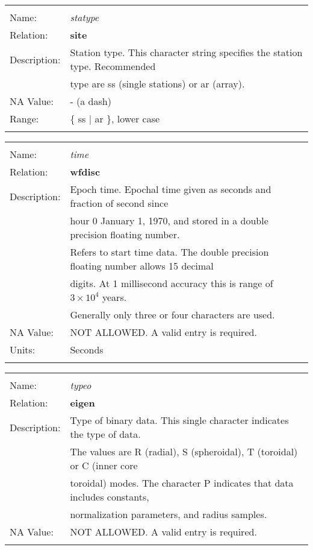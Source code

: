 \begin{tabular*}{6.5 in}{ll} \hline
\\
Name: & {\it statype} \\
Relation: & {\bf site} \\
Description: & Station type. This character string specifies the station type. Recommended \\
& type are ss (single stations) or ar (array). \\
NA Value: & - (a dash) \\
Range: & \{ ss $|$ ar \}, lower case \\
&\\
\end{tabular*}
\begin{tabular*}{6.5 in}{ll} \hline
\\
Name: & {\it time} \\
Relation: & {\bf wfdisc} \\
Description: & Epoch time. Epochal time given as seconds and fraction of second since \\
& hour $0$ January 1, 1970, and stored in a double precision floating number. \\
& Refers to start time data. The double precision floating number allows 15 decimal \\
& digits. At 1 millisecond accuracy this is range of $3 \times 10^4$ years. \\
& Generally only three or four characters are used. \\
NA Value: & NOT ALLOWED. A valid entry is required. \\
Units: & Seconds \\
&\\
\end{tabular*}
\begin{tabular*}{6.5 in}{ll} \hline
\\
Name: & {\it typeo} \\
Relation: & {\bf eigen} \\
Description: & Type of binary data. This  single character indicates the type of data. \\
& The values are R (radial), S (spheroidal), T (toroidal) or C (inner core \\
& toroidal) modes. The character P indicates that data includes constants, \\
& normalization  parameters, and radius samples. \\
NA Value: & NOT ALLOWED. A valid entry is required. \\
&\\
\end{tabular*}
